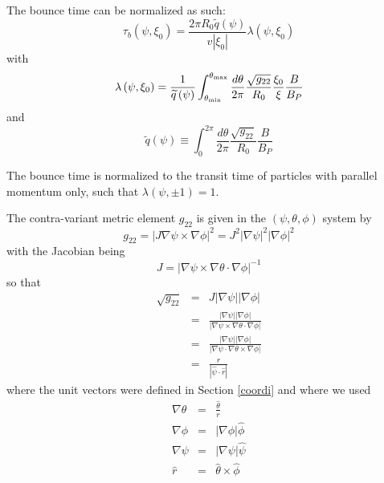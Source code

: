 \documentclass{article}
\begin{document}
The bounce time can be normalized as such: 
\begin{equation}
\tau _{b}\left( \psi ,\xi _{0}\right) =\frac{2\pi R_{0}\widetilde{q}\left(
\psi \right) }{v\left| \xi _{0}\right| }\lambda \left( \psi ,\xi _{0}\right) 
\end{equation}
with 
\begin{equation}
\lambda \left( \psi ,\xi _{0}\right) =\frac{1}{\widetilde{q}\left( \psi
\right) }\int_{\theta _{\min }}^{\theta _{\max }}\frac{d\theta }{2\pi }\frac{%
\sqrt{g_{22}}}{R_{0}}\frac{\xi _{0}}{\xi }\frac{B}{B_{P}}  \label{lambda0}
\end{equation}
and
\begin{equation}
\widetilde{q}\left( \psi \right) \equiv \int_{0}^{2\pi }\frac{d\theta }{2\pi 
}\frac{\sqrt{g_{22}}}{R_{0}}\frac{B}{B_{P}}
\end{equation}

The bounce time is normalized to the transit time of particles with parallel
momentum only, such that $\lambda \left( \psi ,\pm 1\right) =1$.

The contra-variant metric element $g_{22}$ is given in the $\left( \psi
,\theta ,\phi \right) $ system by 
\[
g_{22}=\left| J\nabla \psi \times \nabla \phi \right| ^{2}=J^{2}\left|
\nabla \psi \right| ^{2}\left| \nabla \phi \right| ^{2}
\]
with the Jacobian being 
\begin{equation}
J=\left| \nabla \psi \times \nabla \theta \cdot \nabla \phi \right| ^{-1}
\label{jacobian}
\end{equation}
so that 
\begin{eqnarray*}
\sqrt{g_{22}} &=&J\left| \nabla \psi \right| \left| \nabla \phi \right|  \\
&=&\frac{\left| \nabla \psi \right| \left| \nabla \phi \right| }{\left|
\nabla \psi \times \nabla \theta \cdot \nabla \phi \right| } \\
&=&\frac{\left| \nabla \psi \right| \left| \nabla \phi \right| }{\left|
\nabla \psi \cdot \nabla \theta \times \nabla \phi \right| } \\
&=&\frac{r}{\left| \widehat{\psi }\cdot \widehat{r}\right| }
\end{eqnarray*}
where the unit vectors were defined in Section \ref{coordi} and where we
used 
\begin{eqnarray*}
\nabla \theta  &=&\frac{\widehat{\theta }}{r} \\
\nabla \phi  &=&\left| \nabla \phi \right| \widehat{\phi } \\
\nabla \psi  &=&\left| \nabla \psi \right| \widehat{\psi } \\
\widehat{r} &=&\widehat{\theta }\times \widehat{\phi }
\end{eqnarray*}
\end{document}

